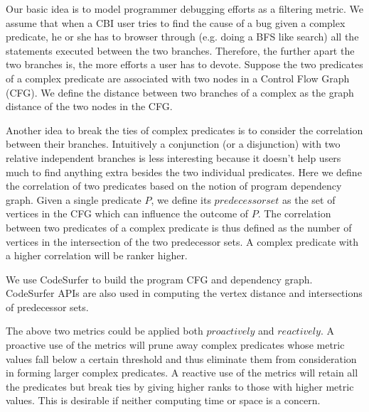 \documentclass{article}
\begin{document}
Our basic idea is to model programmer debugging efforts as a
filtering metric. We assume that when a CBI user tries to find the
cause of a bug given a complex predicate, he or she has to browser
through (e.g. doing a BFS like search) all the statements executed
between the two branches. Therefore, the further apart the two
branches is, the more efforts a user has to devote. Suppose the
two predicates of a complex predicate are associated with two
nodes in a Control Flow Graph (CFG). We define the distance
between two branches of a complex as the graph distance of the two
nodes in the CFG.

Another idea to break the ties of complex predicates is to
consider the correlation between their branches. Intuitively a
conjunction (or a disjunction) with two relative independent
branches is less interesting because it doesn't help users much to
find anything extra besides the two individual predicates. Here we
define the correlation of two predicates based on the notion of
program dependency graph. Given a single predicate $P$, we define
its $predecessor set$ as the set of vertices in the CFG which can
influence the outcome of $P$. The correlation between two
predicates of a complex predicate is thus defined as the number of
vertices in the intersection of the two predecessor sets. A
complex predicate with a higher correlation will be ranker higher.

We use CodeSurfer to build the program CFG and dependency graph.
CodeSurfer APIs are also used in computing the vertex distance and
intersections of predecessor sets.

The above two metrics could be applied both $proactively$ and
$reactively$. A proactive use of the metrics will prune away
complex predicates whose metric values fall below a certain
threshold and thus eliminate them from consideration in forming
larger complex predicates. A reactive use of the metrics will
retain all the predicates but break ties by giving higher ranks to
those with higher metric values. This is desirable if neither
computing time or space is a concern.
\end{document}
